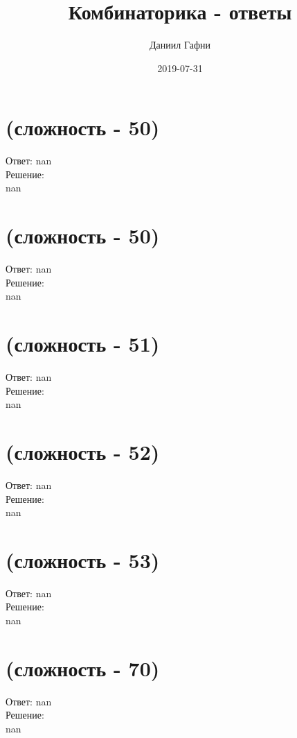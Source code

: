 \documentclass[a4paper,11pt]{article}%
\title{Комбинаторика {-} ответы}%
\author{Даниил Гафни}%
\date{2019{-}07{-}31}%
\begin{document}
%
\normalsize%
\maketitle%
\section{(сложность {-} 50)}%
\label{sec:( {-} 50)}%
\hspace{3ex} Ответ: nan \\%
%
\hspace*{3ex} Решение: \\%
nan

%
\section{(сложность {-} 50)}%
\label{sec:( {-} 50)}%
\hspace{3ex} Ответ: nan \\%
%
\hspace*{3ex} Решение: \\%
nan

%
\section{(сложность {-} 51)}%
\label{sec:( {-} 51)}%
\hspace{3ex} Ответ: nan \\%
%
\hspace*{3ex} Решение: \\%
nan

%
\section{(сложность {-} 52)}%
\label{sec:( {-} 52)}%
\hspace{3ex} Ответ: nan \\%
%
\hspace*{3ex} Решение: \\%
nan

%
\section{(сложность {-} 53)}%
\label{sec:( {-} 53)}%
\hspace{3ex} Ответ: nan \\%
%
\hspace*{3ex} Решение: \\%
nan

%
\section{(сложность {-} 70)}%
\label{sec:( {-} 70)}%
\hspace{3ex} Ответ: nan \\%
%
\hspace*{3ex} Решение: \\%
nan
\end{document}
